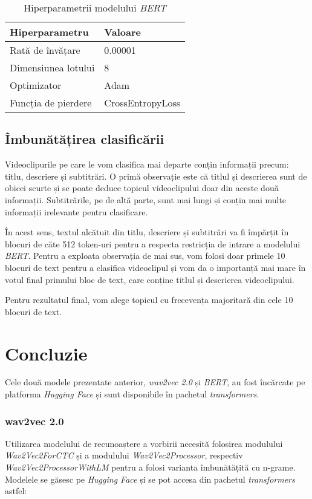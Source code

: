 \begin{table}[ht]
    \centering
    \begin{tabular}{@{}ll@{}}
        \toprule
        \textbf{Hiperparametru}   & \textbf{Valoare}         \\
        \midrule
        Rată de învățare             & 0.00001                  \\
        Dimensiunea lotului             & 8                        \\
        Optimizator                      & Adam                     \\
        Funcția de pierdere          & CrossEntropyLoss         \\
        \bottomrule
    \end{tabular}
    \caption{Hiperparametrii modelului \textit{BERT}}
    \label{tab:bert-hyperparameters}
\end{table}


\subsection{Îmbunătățirea clasificării}
Videoclipurile pe care le vom clasifica mai departe conțin informații precum: titlu, descriere și subtitrări.
O primă observație este că titlul și descrierea sunt de obicei scurte și se poate deduce topicul videoclipului
doar din aceste două informații. Subtitrările, pe de altă parte, sunt mai lungi și conțin mai multe informații 
irelevante pentru clasificare. 
\par
În acest sens, textul alcătuit din titlu, descriere și subtitrări va fi împărțit în blocuri de căte 512 token-uri
pentru a respecta restricția de intrare a modelului \textit{BERT}. Pentru a exploata observația de mai sus,
vom folosi doar primele 10 blocuri de text pentru a clasifica videoclipul și vom da o importanță mai mare în
votul final primului bloc de text, care conține titlul și descrierea videoclipului.
\par
Pentru rezultatul final, vom alege topicul cu frecevența majoritară din cele 10 blocuri de text.


\section{Concluzie}
Cele două modele prezentate anterior, \textit{wav2vec 2.0} și \textit{BERT}, au fost încărcate
pe platforma \textit{Hugging Face} și sunt disponibile în pachetul \textit{transformers}.

\subsubsection{wav2vec 2.0}
Utilizarea modelului de recunoaștere a vorbirii necesită folosirea modulului \textit{Wav2Vec2ForCTC}
și a modulului \textit{Wav2Vec2Processor}, respectiv \textit{Wav2Vec2ProcessorWithLM} pentru a folosi varianta
îmbunătățită cu n-grame. Modelele se găsesc pe \textit{Hugging Face} și se pot accesa din pachetul \textit{transformers} astfel:

